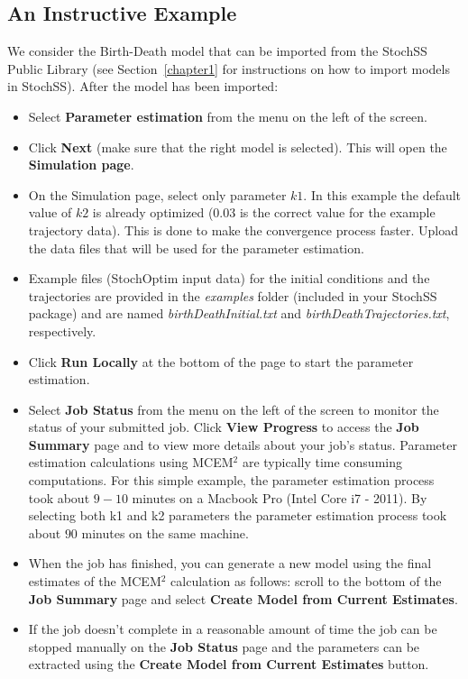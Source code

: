 \subsection{An Instructive Example}
We consider the Birth-Death model that can be imported from the StochSS Public Library (see Section~\ref{chapter1} for instructions on how to import models in StochSS).
After the model has been imported:
\begin{itemize}
\item Select \textbf{Parameter estimation} from the menu on the left of the screen.
\item Click \textbf{Next} (make sure that the right model is selected). This will open the \textbf{Simulation page}.
\item On the Simulation page, select only parameter $k1$. In this example the default value of $k2$ is already optimized (0.03 is the correct value for the example trajectory data). This is done to make the convergence process faster. Upload the data files that will be used for the parameter estimation.
\item Example files (StochOptim input data) for the initial conditions and the trajectories are provided in the \textit{examples} folder (included in your StochSS package) and are named \textit{birthDeathInitial.txt} and \textit{birthDeathTrajectories.txt}, respectively.
\item Click \textbf{Run Locally} at the bottom of the page to start the parameter estimation.
\item Select \textbf{Job Status} from the menu on the left of the screen to monitor the status of your submitted job.
Click \textbf{View Progress} to access the \textbf{Job Summary} page and to view more details about your job's status. Parameter estimation calculations using MCEM$^2$ are typically time consuming computations. For this simple example, the parameter estimation process took about $9-10$ minutes on a Macbook Pro (Intel Core i7 - 2011). By selecting both k1 and k2 parameters the parameter estimation process took about $90$ minutes on the same machine.

\item When the job has finished, you can generate a new model using the final estimates of the MCEM$^2$ calculation as follows: scroll to the bottom of the \textbf{Job Summary} page and select \textbf{Create Model from Current Estimates}. 
\item If the job doesn't complete in a reasonable amount of time the job can be stopped manually on the \textbf{Job Status} page and the parameters can be extracted using the \textbf{Create Model from Current Estimates} button.
\end{itemize}

